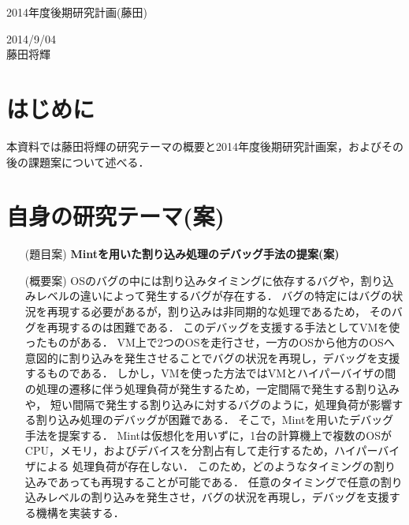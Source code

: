 \documentclass[12pt]{jsarticle}
\begin{document}

\begin{center}
{\LARGE 2014年度後期研究計画(藤田)}
\end{center}

\begin{flushright}
  2014/9/04\\
  藤田将輝
\end{flushright}
\section{はじめに}

本資料では藤田将輝の研究テーマの概要と2014年度後期研究計画案，およびその後の課題案について述べる．


\section{自身の研究テーマ(案)}
\begin{itemize}
\item[(題目案)] {\bf Mintを用いた割り込み処理のデバッグ手法の提案(案)}

\item[(概要案)] OSのバグの中には割り込みタイミングに依存するバグや，割り込みレベルの違いによって発生するバグが存在する．
バグの特定にはバグの状況を再現する必要があるが，割り込みは非同期的な処理であるため，
そのバグを再現するのは困難である．
このデバッグを支援する手法としてVMを使ったものがある．
VM上で2つのOSを走行させ，一方のOSから他方のOSへ意図的に割り込みを発生させることでバグの状況を再現し，デバッグを支援するものである．
しかし，VMを使った方法ではVMとハイパーバイザの間の処理の遷移に伴う処理負荷が発生するため，一定間隔で発生する割り込みや，
短い間隔で発生する割り込みに対するバグのように，処理負荷が影響する割り込み処理のデバッグが困難である．
そこで，Mintを用いたデバッグ手法を提案する．
Mintは仮想化を用いずに，1台の計算機上で複数のOSがCPU，メモリ，およびデバイスを分割占有して走行するため，ハイパーバイザによる
処理負荷が存在しない．
このため，どのようなタイミングの割り込みであっても再現することが可能である．
任意のタイミングで任意の割り込みレベルの割り込みを発生させ，バグの状況を再現し，デバッグを支援する機構を実装する．
\end{itemize}
\end{document}

